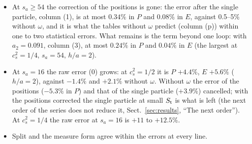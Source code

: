 \documentclass[11pt,aps,preprint,nofootinbib,superscriptaddress,tightenlines]{revtex4-2}
\def\Sect#1{Sect.~\ref{#1}}
\begin{document}
\begin{itemize}
\item At $s_a\ge54$ the correction of the positions is gone: the error after the single particle, column (1), is at most $0.34\%$ in $P$ and $0.08\%$ in
  $E$, against 0.5--5\% without $\omega$, and it is what the tables without $\omega$ predict (column (p)) within one to two statistical errors.  What
  remains is the term beyond one loop: with $a_2=0.091$, column (3), at most $0.24\%$ in $P$ and $0.04\%$ in $E$ (the largest at $c_s^2=1/4$,
  $s_a=54$, $h/a=2$).
\item At $s_a=16$ the raw error (0) grows: at $c_s^2=1/2$ it is $P$ $+4.4\%$, $E$ $+5.6\%$ ($h/a=2$), against $-1.4\%$ and $+2.1\%$ without $\omega$.
  Without $\omega$ the error of the positions ($-5.3\%$ in $P$) and that of the single particle ($+3.9\%$) cancelled; with the positions corrected the
  single particle at small $S_{\rm t}$ is what is left (the next order of the series does not reduce it, \Sect{sec:results}, ``The next order'').
  At $c_s^2=1/4$ the raw error at $s_a=16$ is $+11$ to $+12.5\%$.
\item Split and the measure form agree within the errors at every line.
\end{itemize}
\end{document}
